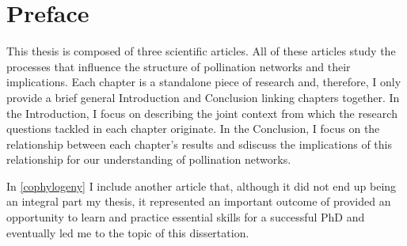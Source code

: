 
{}
\chapter*{Preface}

\manualmark
{}

\noindent This thesis is composed of three scientific articles.
All of these articles study the processes that influence the structure of pollination networks and their implications.
Each chapter is a standalone piece of research and, therefore, I only provide a brief general Introduction and Conclusion linking chapters together.
In the Introduction, I focus on describing the joint context from which the research questions tackled in each chapter originate.
In the Conclusion, I focus on the relationship between each chapter's results and sdiscuss the implications of this relationship for our understanding of pollination networks.

In \autoref{cophylogeny} I include another article that, although it did not end up being an integral part my thesis, it represented an important outcome of provided an opportunity to learn and practice essential skills for a successful PhD and eventually led me to the topic of this dissertation.

\vfill
